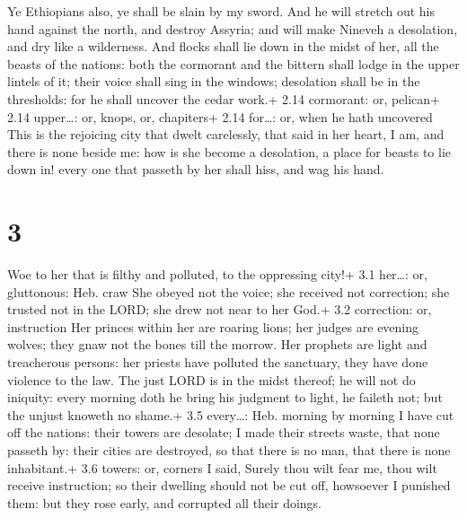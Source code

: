  Ye Ethiopians also, ye shall be slain by my sword.
 And he will stretch out his hand against the north, and
destroy Assyria; and will make Nineveh a desolation, and dry like a
wilderness.  And flocks shall lie down in the midst of her,
all the beasts of the nations: both the cormorant and the bittern shall
lodge in the upper lintels of it; their voice shall sing in the windows;
desolation shall be in the thresholds: for he shall uncover the cedar
work.+ 2.14 cormorant: or, pelican+ 2.14 upper\ldots: or, knops, or,
chapiters+ 2.14 for\ldots: or, when he hath uncovered  This
is the rejoicing city that dwelt carelessly, that said in her heart, I
am, and there is none beside me: how is she become a desolation, a place
for beasts to lie down in! every one that passeth by her shall hiss, and
wag his hand.

\hypertarget{section-2}{%
\section{3}\label{section-2}}

 Woe to her that is filthy and polluted, to the oppressing
city!+ 3.1 her\ldots: or, gluttonous: Heb. craw  She obeyed
not the voice; she received not correction; she trusted not in the LORD;
she drew not near to her God.+ 3.2 correction: or, instruction
 Her princes within her are roaring lions; her judges are
evening wolves; they gnaw not the bones till the morrow. 
Her prophets are light and treacherous persons: her priests have
polluted the sanctuary, they have done violence to the law. 
The just LORD is in the midst thereof; he will not do iniquity: every
morning doth he bring his judgment to light, he faileth not; but the
unjust knoweth no shame.+ 3.5 every\ldots: Heb. morning by morning
 I have cut off the nations: their towers are desolate; I
made their streets waste, that none passeth by: their cities are
destroyed, so that there is no man, that there is none inhabitant.+ 3.6
towers: or, corners  I said, Surely thou wilt fear me, thou
wilt receive instruction; so their dwelling should not be cut off,
howsoever I punished them: but they rose early, and corrupted all their
doings.

